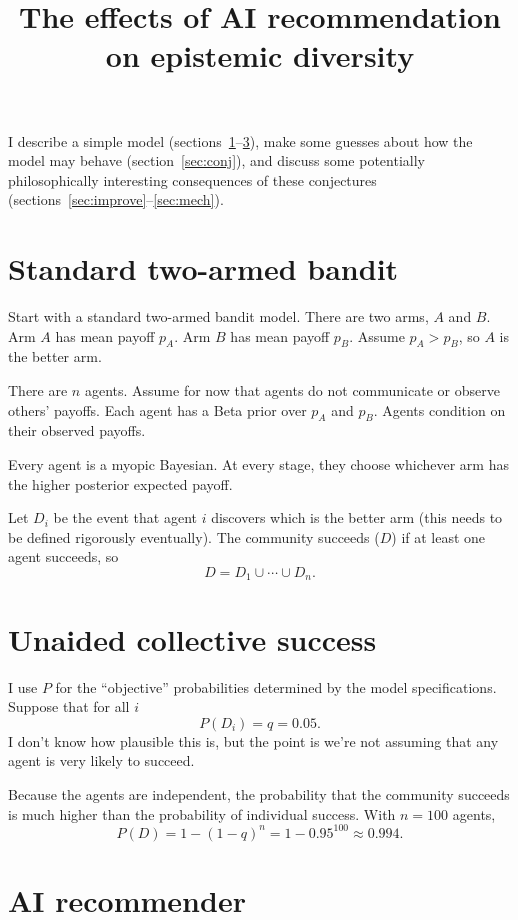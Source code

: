\documentclass[12pt]{article}
\title{The effects of AI recommendation on epistemic diversity}
\author{}
\date{}
\begin{document}
\maketitle

I describe a simple model (sections~\ref{sec:bandit}--\ref{sec:airec}), make some guesses about how the model may behave (section~\ref{sec:conj}), and discuss some potentially philosophically interesting consequences of these conjectures (sections~\ref{sec:improve}--\ref{sec:mech}).

\section{Standard two-armed bandit}
\label{sec:bandit}

Start with a standard two-armed bandit model.
There are two arms, $A$ and $B$.
Arm $A$ has mean payoff $p_A$.
Arm $B$ has mean payoff $p_B$.
Assume $p_A > p_B$, so $A$ is the better arm.

There are $n$ agents.
Assume for now that agents do not communicate or observe others' payoffs.
Each agent has a Beta prior over $p_A$ and $p_B$.
Agents condition on their observed payoffs.

Every agent is a myopic Bayesian.
At every stage, they choose whichever arm has the higher posterior expected payoff.

Let $D_i$ be the event that agent $i$ discovers which is the better arm (this needs to be defined rigorously eventually).
The community succeeds ($D$) if at least one agent succeeds, so
\[
  D = D_1 \cup \cdots \cup D_n.
\]

\section{Unaided collective success}
\label{sec:unaided}

I use $P$ for the ``objective'' probabilities determined by the model specifications.
Suppose that for all $i$
\[
  P(D_i) = q = 0.05.
\]
I don't know how plausible this is, but the point is we're not assuming that any agent is very likely to succeed.

Because the agents are independent, the probability that the community succeeds is much higher than the probability of individual success.
With $n = 100$ agents,
\[
  P(D) = 1 - (1-q)^n = 1 - 0.95^{100} \approx 0.994.
\]

\section{AI recommender}
\label{sec:airec}
\end{document}
